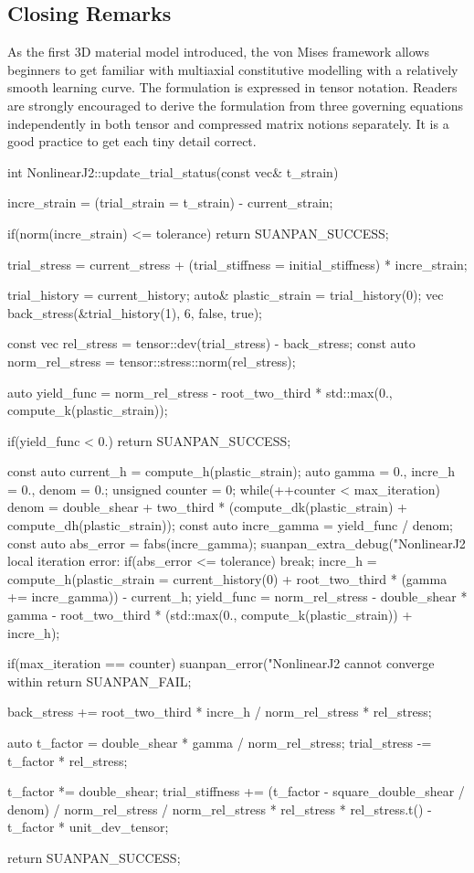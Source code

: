 \subsection{Closing Remarks}
As the first 3D material model introduced, the von Mises framework allows beginners to get familiar with multiaxial constitutive modelling with a relatively smooth learning curve. The formulation is expressed in tensor notation. Readers are strongly encouraged to derive the formulation from three governing equations independently in both tensor and compressed matrix notions separately. It is a good practice to get each tiny detail correct.
\begin{cppcode}
int NonlinearJ2::update_trial_status(const vec& t_strain) {
    incre_strain = (trial_strain = t_strain) - current_strain;

    if(norm(incre_strain) <= tolerance) return SUANPAN_SUCCESS;

    trial_stress = current_stress + (trial_stiffness = initial_stiffness) * incre_strain;

    trial_history = current_history;
    auto& plastic_strain = trial_history(0);
    vec back_stress(&trial_history(1), 6, false, true);

    const vec rel_stress = tensor::dev(trial_stress) - back_stress;
    const auto norm_rel_stress = tensor::stress::norm(rel_stress);

    auto yield_func = norm_rel_stress - root_two_third * std::max(0., compute_k(plastic_strain));

    if(yield_func < 0.) return SUANPAN_SUCCESS;

    const auto current_h = compute_h(plastic_strain);
    auto gamma = 0., incre_h = 0., denom = 0.;
    unsigned counter = 0;
    while(++counter < max_iteration) {
        denom = double_shear + two_third * (compute_dk(plastic_strain) + compute_dh(plastic_strain));
        const auto incre_gamma = yield_func / denom;
        const auto abs_error = fabs(incre_gamma);
        suanpan_extra_debug("NonlinearJ2 local iteration error: %
        if(abs_error <= tolerance) break;
        incre_h = compute_h(plastic_strain = current_history(0) + root_two_third * (gamma += incre_gamma)) - current_h;
        yield_func = norm_rel_stress - double_shear * gamma - root_two_third * (std::max(0., compute_k(plastic_strain)) + incre_h);
    }

    if(max_iteration == counter) {
        suanpan_error("NonlinearJ2 cannot converge within %
        return SUANPAN_FAIL;
    }

    back_stress += root_two_third * incre_h / norm_rel_stress * rel_stress;

    auto t_factor = double_shear * gamma / norm_rel_stress;
    trial_stress -= t_factor * rel_stress;

    t_factor *= double_shear;
    trial_stiffness += (t_factor - square_double_shear / denom) / norm_rel_stress / norm_rel_stress * rel_stress * rel_stress.t() - t_factor * unit_dev_tensor;

    return SUANPAN_SUCCESS;
}
\end{cppcode}

